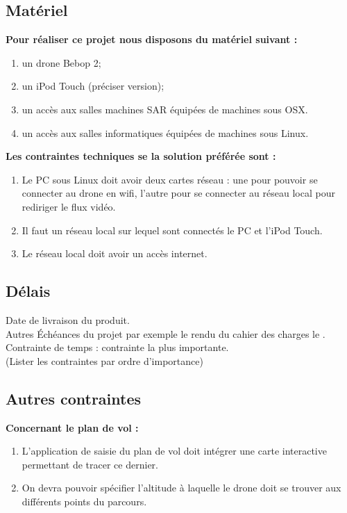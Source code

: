 \documentclass{article}
\begin{document}
	\subsection{Matériel}
		\begin{flushleft}
	        \textbf{Pour réaliser ce projet nous disposons du matériel suivant :}
	    \end{flushleft}
		\begin{enumerate}
        \item un drone Bebop 2;
        \item un iPod Touch (préciser version);
        \item un accès aux salles machines SAR équipées de machines sous OSX.
        \item un accès aux salles informatiques équipées de machines sous Linux.
        \end{enumerate}
        \begin{flushleft}
	        \textbf{Les contraintes techniques se la solution préférée sont :}
	    \end{flushleft}
		\begin{enumerate}
        \item Le PC sous Linux doit avoir deux cartes réseau : une pour pouvoir se connecter au drone en wifi, l'autre pour se connecter au réseau local pour rediriger le flux vidéo.
        \item Il faut un réseau local sur lequel sont connectés le PC et l'iPod Touch.
        \item Le réseau local doit avoir un accès internet.
        \end{enumerate}
	\subsection{Délais}
		Date de livraison du produit.\\
		Autres Échéances du projet par exemple le rendu du cahier des charges le .
		Contrainte de temps : contrainte la plus importante.\\
		(Lister les contraintes par ordre d'importance)
	\subsection{Autres contraintes}
	    \begin{flushleft}
	        \textbf{Concernant le plan de vol :} 
	    \end{flushleft}
	    \begin{enumerate}
            \item  L'application de saisie du plan de vol doit intégrer une carte interactive permettant de tracer ce dernier.
    		 \item On devra pouvoir spécifier l'altitude à laquelle le drone doit se trouver aux différents points du parcours.
		 \end{enumerate}
		
\end{document}
